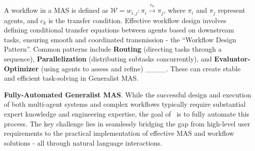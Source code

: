 A workflow in a MAS is defined as $\mathcal{W} = {w_{i,j}: \pi_i \xrightarrow{c_k} \pi_j}$, where $\pi_i$ and $\pi_j$ represent agents, and $c_k$ is the transfer condition. Effective workflow design involves defining conditional transfer equations between agents based on downstream tasks, ensuring smooth and coordinated transmission - the ``Workflow Design Pattern''. Common patterns include \textbf{Routing} (directing tasks through a sequence), \textbf{Parallelization} (distributing subtasks concurrently), and \textbf{Evaluator-Optimizer} (using agents to assess and refine) ____. These can create stable and efficient task-solving in Generalist MAS.

\noindent \textbf{Fully-Automated Generalist MAS}. While the successful design and execution of both multi-agent systems and complex workflows typically require substantial expert knowledge and engineering expertise, the goal of \model\ is to fully automate this process. The key challenge lies in seamlessly bridging the gap from high-level user requirements to the practical implementation of effective MAS and workflow solutions - all through natural language interactions.